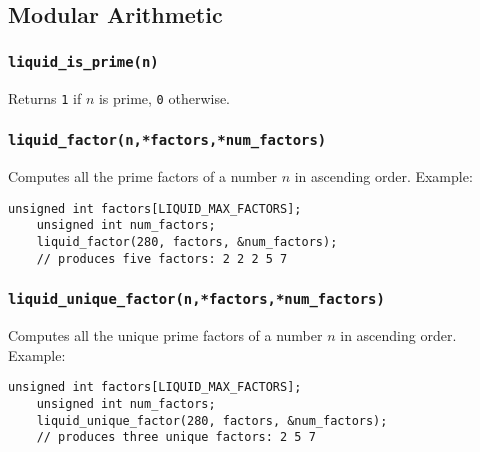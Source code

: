 

% 
%

\subsection{Modular Arithmetic}
\label{module:math:mod}

\subsubsection{{\tt liquid\_is\_prime(n)}}
\label{module:math:mod:liquid_is_prime}
Returns {\tt 1} if $n$ is prime, {\tt 0} otherwise.

\subsubsection{{\tt liquid\_factor(n,*factors,*num\_factors)}}
\label{module:math:mod:liquid_factor}
Computes all the prime factors of a number $n$ in ascending order.
Example:
\begin{Verbatim}[fontsize=\small]
    unsigned int factors[LIQUID_MAX_FACTORS];
    unsigned int num_factors;
    liquid_factor(280, factors, &num_factors);
    // produces five factors: 2 2 2 5 7
\end{Verbatim}

\subsubsection{{\tt liquid\_unique\_factor(n,*factors,*num\_factors)}}
\label{module:math:mod:liquid_unique_factor}
Computes all the unique prime factors of a number $n$ in ascending order.
Example:
\begin{Verbatim}[fontsize=\small]
    unsigned int factors[LIQUID_MAX_FACTORS];
    unsigned int num_factors;
    liquid_unique_factor(280, factors, &num_factors);
    // produces three unique factors: 2 5 7
\end{Verbatim}

